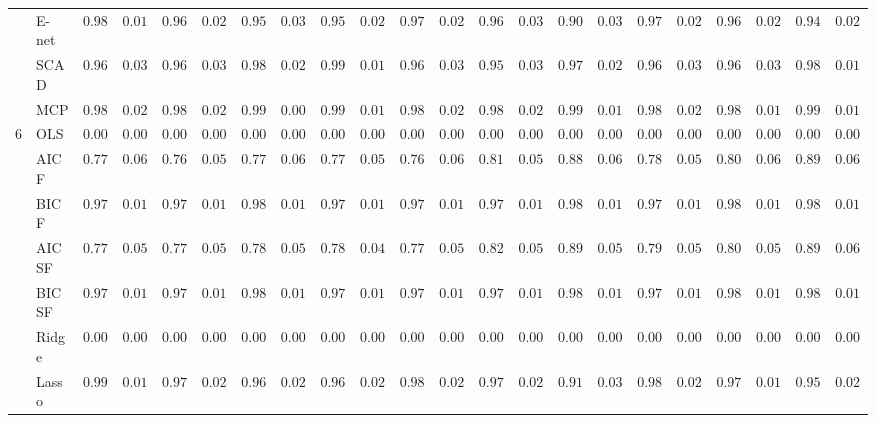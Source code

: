 \begin{tabular}{ll|ll|llllll|llllll|llllll}
 & E-net  & $0.9854$ & $0.0169$ & $0.9671$ & $0.0289$ & $0.9566$ & $0.0310$ & $0.9568$ & $0.0293$ & $0.9778$ & $0.0286$ & $0.9668$ & $0.0346$ & $0.9011$ & $0.0391$ & $0.9767$ & $0.0247$ & $0.9620$ & $0.0222$ & $0.9465$ & $0.0267$ \\
 & SCAD  & $0.9625$ & $0.0383$ & $0.9676$ & $0.0355$ & $0.9800$ & $0.0231$ & $0.9953$ & $0.0156$ & $0.9605$ & $0.0388$ & $0.9570$ & $0.0375$ & $0.9791$ & $0.0280$ & $0.9631$ & $0.0373$ & $0.9645$ & $0.0304$ & $0.9883$ & $0.0170$ \\
 & MCP  & $0.9866$ & $0.0200$ & $0.9877$ & $0.0210$ & $0.9959$ & $0.0094$ & $0.9958$ & $0.0144$ & $0.9869$ & $0.0235$ & $0.9849$ & $0.0223$ & $0.9916$ & $0.0135$ & $0.9849$ & $0.0203$ & $0.9881$ & $0.0145$ & $0.9929$ & $0.0130$ \\\hline
6 & OLS  & $0.0000$ & $0.0000$ & $0.0000$ & $0.0000$ & $0.0000$ & $0.0000$ & $0.0000$ & $0.0000$ & $0.0000$ & $0.0000$ & $0.0000$ & $0.0000$ & $0.0000$ & $0.0000$ & $0.0000$ & $0.0000$ & $0.0000$ & $0.0000$ & $0.0000$ & $0.0000$ \\
 & AIC F  & $0.7760$ & $0.0636$ & $0.7662$ & $0.0549$ & $0.7760$ & $0.0629$ & $0.7783$ & $0.0557$ & $0.7682$ & $0.0619$ & $0.8160$ & $0.0554$ & $0.8895$ & $0.0673$ & $0.7869$ & $0.0525$ & $0.8017$ & $0.0635$ & $0.8929$ & $0.0670$ \\
 & BIC F  & $0.9732$ & $0.0155$ & $0.9789$ & $0.0179$ & $0.9805$ & $0.0177$ & $0.9783$ & $0.0150$ & $0.9760$ & $0.0174$ & $0.9793$ & $0.0139$ & $0.9889$ & $0.0121$ & $0.9786$ & $0.0155$ & $0.9833$ & $0.0159$ & $0.9896$ & $0.0121$ \\
 & AIC SF  & $0.7794$ & $0.0571$ & $0.7708$ & $0.0567$ & $0.7851$ & $0.0555$ & $0.7829$ & $0.0488$ & $0.7784$ & $0.0559$ & $0.8212$ & $0.0542$ & $0.8971$ & $0.0589$ & $0.7919$ & $0.0528$ & $0.8065$ & $0.0589$ & $0.8974$ & $0.0603$ \\
 & BIC SF  & $0.9736$ & $0.0148$ & $0.9791$ & $0.0174$ & $0.9807$ & $0.0175$ & $0.9782$ & $0.0151$ & $0.9760$ & $0.0174$ & $0.9795$ & $0.0137$ & $0.9890$ & $0.0122$ & $0.9786$ & $0.0156$ & $0.9834$ & $0.0157$ & $0.9896$ & $0.0121$ \\
 & Ridge  & $0.0000$ & $0.0000$ & $0.0000$ & $0.0000$ & $0.0000$ & $0.0000$ & $0.0000$ & $0.0000$ & $0.0000$ & $0.0000$ & $0.0000$ & $0.0000$ & $0.0000$ & $0.0000$ & $0.0000$ & $0.0000$ & $0.0000$ & $0.0000$ & $0.0000$ & $0.0000$ \\
 & Lasso  & $0.9900$ & $0.0144$ & $0.9769$ & $0.0245$ & $0.9694$ & $0.0268$ & $0.9690$ & $0.0243$ & $0.9864$ & $0.0226$ & $0.9774$ & $0.0291$ & $0.9120$ & $0.0362$ & $0.9833$ & $0.0209$ & $0.9719$ & $0.0193$ & $0.9556$ & $0.0236$ \\

\end{tabular}
